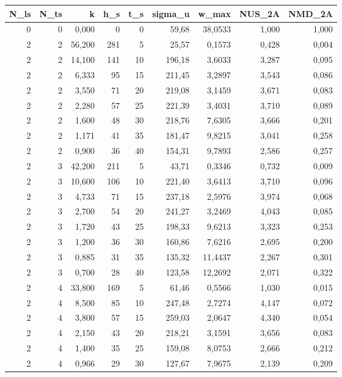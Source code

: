 \begin{tabular}{rrrrrrrrr}
\toprule
N_ls & N_ts & k & h_s & t_s & sigma_u & w_max & NUS_2A & NMD_2A \\ \hline
\midrule
0 & 0 & 0,000 & 0 & 0 & 59,68 & 38,0533 & 1,000 & 1,000 \\ \hline
2 & 2 & 56,200 & 281 & 5 & 25,57 & 0,1573 & 0,428 & 0,004 \\ \hline
2 & 2 & 14,100 & 141 & 10 & 196,18 & 3,6033 & 3,287 & 0,095 \\ \hline
2 & 2 & 6,333 & 95 & 15 & 211,45 & 3,2897 & 3,543 & 0,086 \\ \hline
2 & 2 & 3,550 & 71 & 20 & 219,08 & 3,1459 & 3,671 & 0,083 \\ \hline
2 & 2 & 2,280 & 57 & 25 & 221,39 & 3,4031 & 3,710 & 0,089 \\ \hline
2 & 2 & 1,600 & 48 & 30 & 218,76 & 7,6305 & 3,666 & 0,201 \\ \hline
2 & 2 & 1,171 & 41 & 35 & 181,47 & 9,8215 & 3,041 & 0,258 \\ \hline
2 & 2 & 0,900 & 36 & 40 & 154,31 & 9,7893 & 2,586 & 0,257 \\ \hline
2 & 3 & 42,200 & 211 & 5 & 43,71 & 0,3346 & 0,732 & 0,009 \\ \hline
2 & 3 & 10,600 & 106 & 10 & 221,40 & 3,6413 & 3,710 & 0,096 \\ \hline
2 & 3 & 4,733 & 71 & 15 & 237,18 & 2,5976 & 3,974 & 0,068 \\ \hline
2 & 3 & 2,700 & 54 & 20 & 241,27 & 3,2469 & 4,043 & 0,085 \\ \hline
2 & 3 & 1,720 & 43 & 25 & 198,33 & 9,6213 & 3,323 & 0,253 \\ \hline
2 & 3 & 1,200 & 36 & 30 & 160,86 & 7,6216 & 2,695 & 0,200 \\ \hline
2 & 3 & 0,885 & 31 & 35 & 135,32 & 11,4437 & 2,267 & 0,301 \\ \hline
2 & 3 & 0,700 & 28 & 40 & 123,58 & 12,2692 & 2,071 & 0,322 \\ \hline
2 & 4 & 33,800 & 169 & 5 & 61,46 & 0,5566 & 1,030 & 0,015 \\ \hline
2 & 4 & 8,500 & 85 & 10 & 247,48 & 2,7274 & 4,147 & 0,072 \\ \hline
2 & 4 & 3,800 & 57 & 15 & 259,03 & 2,0647 & 4,340 & 0,054 \\ \hline
2 & 4 & 2,150 & 43 & 20 & 218,21 & 3,1591 & 3,656 & 0,083 \\ \hline
2 & 4 & 1,400 & 35 & 25 & 159,08 & 8,0753 & 2,666 & 0,212 \\ \hline
2 & 4 & 0,966 & 29 & 30 & 127,67 & 7,9675 & 2,139 & 0,209 \\ \hline

\end{tabular}
